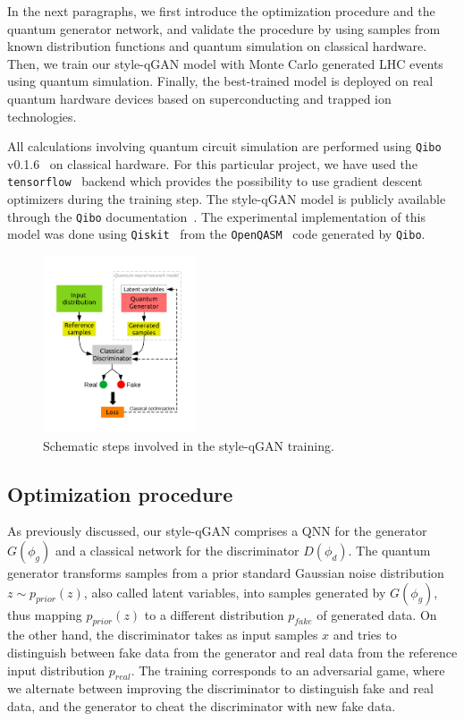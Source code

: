 \documentclass[twocolumn,preprintnumbers,superscriptaddress]{revtex4-2}
\begin{document}
In the next paragraphs, we first introduce the optimization procedure and the quantum
generator network, and validate the procedure by using samples from known
distribution functions and quantum simulation on classical hardware. Then, we
train our style-qGAN model with Monte Carlo generated LHC events using quantum
simulation. Finally, the best-trained model is deployed on real quantum hardware
devices based on superconducting and trapped ion technologies.

All calculations involving quantum circuit simulation are performed using
{\tt Qibo} v0.1.6~\cite{efthymiou2020qibo,stavros_efthymiou_2021_5088103} on
classical hardware. For this particular project, we have used the {\tt
tensorflow}~\cite{tensorflow2015-whitepaper} backend which provides the
possibility to use gradient descent optimizers during the training step. The
style-qGAN model is publicly available through the {\tt Qibo}
documentation~\cite{add_cite_tutorial}. The experimental implementation of this
model was done using {\tt Qiskit}~\cite{gadi_aleksandrowicz_2019_2562111} from
the {\tt OpenQASM}~\cite{cross2017open} code generated by {\tt Qibo}.

\begin{figure}
  \includegraphics[width=0.4\textwidth]{plots/scheme.pdf}
  \caption{\label{fig:scheme} Schematic steps involved in the style-qGAN training.}
\end{figure}

\subsection{Optimization procedure}

As previously discussed, our style-qGAN comprises a QNN for the generator $G(\phi_g)$ and a classical network for the discriminator $D(\phi_d)$. The quantum generator transforms samples from a prior standard Gaussian noise distribution $z \sim p_{prior}(z)$, also called latent variables, into samples generated by $G(\phi_g)$, thus mapping $p_{prior}(z)$ to a different distribution $p_{fake}$ of generated data. On the other hand, the discriminator takes as input samples $x$ and tries to distinguish between fake data from the generator and real data from the reference input distribution $p_{real}$. The training corresponds to an adversarial game, where we alternate between improving the discriminator to distinguish fake and real data, and the generator to cheat the discriminator with new fake data.
\end{document}
